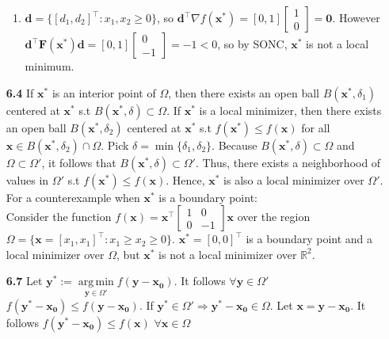 \documentclass[10pt]{article}
\DeclareMathOperator*{\argmin}{arg\,min}
\begin{document}
\begin{enumerate}
\begin{enumerate}
        \item $\mathbf{d}=\{{[d_1,d_2]}^\top:x_1,x_2\ge0\}$, so $\mathbf{d}^\top\nabla f(\mathbf{x^*})=[0,1]\begin{bmatrix}
            1\\
            0
        \end{bmatrix}=\mathbf{0}$. However $\mathbf{d}^\top\mathbf{F (x^*)}\mathbf{d}=[0,1]\begin{bmatrix}
            0\\
            -1
        \end{bmatrix}=-1<0$, so by SONC, $\mathbf{x^*}$ is not a local minimum.
    \end{enumerate}
    \item [\textbf{6.4}] If $\mathbf{x^*}$ is an interior point of $\Omega$, then there exists an open ball $B (\mathbf{x^*},\delta_1)$ centered at $\mathbf{x^*}$ s.t $B (\mathbf{x^*},\delta)\subset\Omega$.
    If $\mathbf{x^*}$ is a local minimizer, then there exists an open ball $B (\mathbf{x^*},\delta_2)$ centered at $\mathbf{x^*}$ s.t $f (\mathbf{x^*})\le f (\mathbf{x})$ for all $\mathbf{x}\in B (\mathbf{x^*},\delta_2)\cap\Omega$.
    Pick $\delta=\min\{\delta_1,\delta_2\}$.  
    Because $B (\mathbf{x^*},\delta)\subset\Omega$ and $\Omega\subset\Omega'$, it follows that $B (\mathbf{x^*},\delta)\subset\Omega'$. 
    Thus, there exists a neighborhood of values in $\Omega'$ s.t $f (\mathbf{x^*})\le f (\mathbf{x})$.
    Hence, $\mathbf{x^*}$ is also a local minimizer over $\Omega'$.\\
    For a counterexample when $\mathbf{x^*}$ is a boundary point:\\
    Consider the function $f (\mathbf{x})=\mathbf{x}^\top\begin{bmatrix}
        1 & 0\\
        0 & -1
    \end{bmatrix}\mathbf{x}$ over the region $\Omega=\{\mathbf{x}={[x_1,x_1]}^\top:x_1\ge x_2\ge0\}$. 
    $\mathbf{x^*}={[0,0]}^\top$ is a boundary point and a local minimizer over $\Omega$, but $\mathbf{x^*}$ is not a local minimizer over $\mathbb{R}^2$.
    \item [\textbf{6.7}] Let $\mathbf{y^*}:=\underset{\mathbf{y}\in\Omega'}{\argmin}f(\mathbf{y}-\mathbf{x_0})$.
    It follows $\forall \mathbf{y}\in\Omega'$ $f(\mathbf{y^*}-\mathbf{x_0})\le f(\mathbf{y}-\mathbf{x_0})$.
    If $\mathbf{y^*}\in\Omega'\Rightarrow \mathbf{y^*}-\mathbf{x_0}\in\Omega$.
    Let $\mathbf{x}=\mathbf{y}-\mathbf{x_0}$.
    It follows $f(\mathbf{y^*}-\mathbf{x_0})\le f(\mathbf{x})$ $\forall\mathbf{x}\in\Omega$

\end{enumerate}
\end{document}

